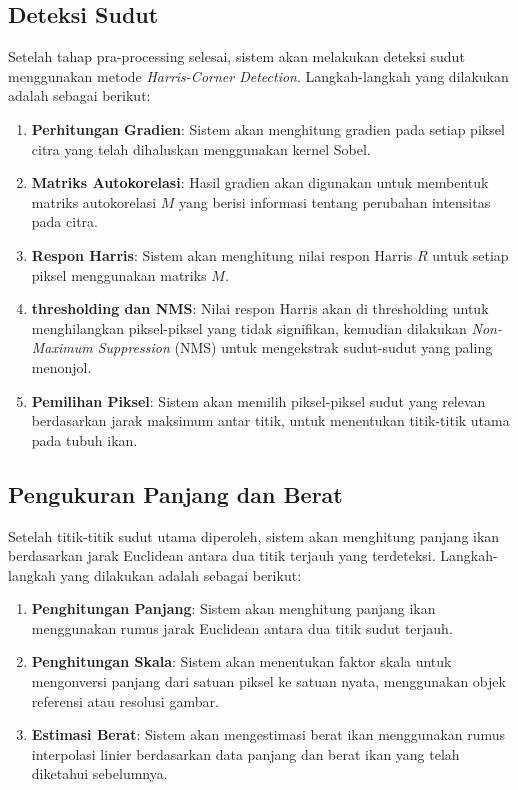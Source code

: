 \subsection{Deteksi Sudut}
    Setelah tahap pra-processing selesai, sistem akan melakukan deteksi sudut menggunakan metode \emph{Harris-Corner Detection}. Langkah-langkah yang dilakukan adalah sebagai berikut: 
    \begin{enumerate}
            \item \textbf{Perhitungan Gradien}: Sistem akan menghitung gradien pada setiap piksel citra yang telah dihaluskan menggunakan kernel Sobel.
            \item \textbf{Matriks Autokorelasi}: Hasil gradien akan digunakan untuk membentuk matriks autokorelasi \(M\) yang berisi informasi tentang perubahan intensitas pada citra.
            \item \textbf{Respon Harris}: Sistem akan menghitung nilai respon Harris \(R\) untuk setiap piksel menggunakan matriks \(M\).
            \item \textbf{thresholding dan NMS}: Nilai respon Harris akan di thresholding untuk menghilangkan piksel-piksel yang tidak signifikan, kemudian dilakukan \emph{Non-Maximum Suppression} (NMS) untuk mengekstrak sudut-sudut yang paling menonjol.
            \item \textbf{Pemilihan Piksel}: Sistem akan memilih piksel-piksel sudut yang relevan berdasarkan jarak maksimum antar titik, untuk menentukan titik-titik utama pada tubuh ikan.
        \end{enumerate}

\subsection{Pengukuran Panjang dan Berat}
    Setelah titik-titik sudut utama diperoleh, sistem akan menghitung panjang ikan berdasarkan jarak Euclidean antara dua titik terjauh yang terdeteksi. Langkah-langkah yang dilakukan adalah sebagai berikut:
\begin{enumerate}
    \item \textbf{Penghitungan Panjang}: Sistem akan menghitung panjang ikan menggunakan rumus jarak Euclidean antara dua titik sudut terjauh.
    \item \textbf{Penghitungan Skala}: Sistem akan menentukan faktor skala untuk mengonversi panjang dari satuan piksel ke satuan nyata, menggunakan objek referensi atau resolusi gambar.
    \item \textbf{Estimasi Berat}: Sistem akan mengestimasi berat ikan menggunakan rumus interpolasi linier berdasarkan data panjang dan berat ikan yang telah diketahui sebelumnya.
\end{enumerate}
